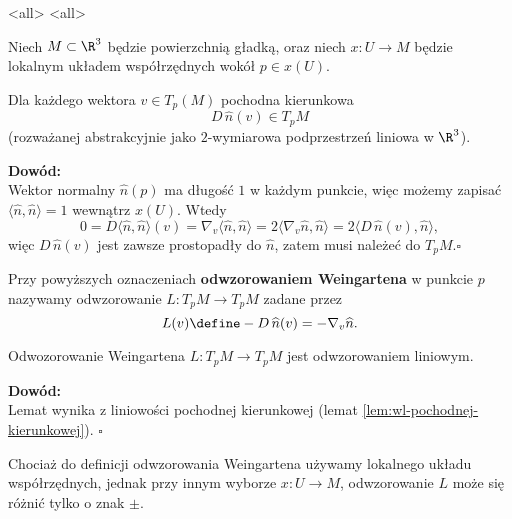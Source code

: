  \mode*
\mode<all>{}
\mode<all>{}

\begin{frame}
\begin{lemat}
Niech $M\subset \R^3$ będzie powierzchnią gładką, oraz niech $x\colon U\to M$ będzie lokalnym układem współrzędnych wokół $p\in x(U)$. 

\pause Dla każdego wektora $v\in T_p(M)$ pochodna kierunkowa \[D\,\widehat{n}(v)\in T_pM\](rozważanej abstrakcyjnie jako $2$-wymiarowa podprzestrzeń liniowa w $\R^3$).
\end{lemat}

\end{frame}
\begin{frame}

\textcolor{ared}{\textbf{Dowód: }}\\\pause 
Wektor normalny $\widehat{n}(p)$ ma długość $1$ w każdym punkcie, więc możemy zapisać $\langle\widehat{n},\widehat{n}\rangle=1$ wewnątrz $x(U)$.
\pause {}
Wtedy \[0=D\langle\widehat{n},\widehat{n}\rangle(v)=\nabla_v \langle\widehat{n},\widehat{n}\rangle=2\langle\nabla_v \widehat{n},\widehat{n}\rangle=2\langle D\,\widehat{n}(v),\widehat{n}\rangle,\] \pause więc $D\,\widehat{n}(v)$ jest zawsze prostopadły do $\widehat{n}$, zatem musi należeć do $T_pM$.\hfill $\square$

\end{frame}
\begin{frame}
\begin{definicja}
Przy powyższych oznaczeniach \textbf{odwzorowaniem Weingartena} w punkcie $p$ nazywamy odwzorowanie $L\colon T_pM\to T_pM$ zadane przez \[L(v)\define -D\,\widehat{n}(v)=-\nabla_v\widehat{n}.\]
\end{definicja}
\pause
\begin{lemat}
Odwozorowanie Weingartena $L\colon T_pM\to T_pM$ jest odwzorowaniem liniowym.
\end{lemat}
\pause \textcolor{ared}{\textbf{Dowód:}}\\
Lemat wynika z liniowości pochodnej kierunkowej (lemat \ref{lem:wl-pochodnej-kierunkowej}).
\hfill $\square$

\end{frame}

\begin{frame}
\begin{uwaga}
Chociaż do definicji odwzorowania Weingartena używamy lokalnego układu współrzędnych, jednak przy innym wyborze $x\colon U\to M$, odwzorowanie $L$ może się różnić tylko o znak $\pm$.
\end{uwaga}
\end{frame}



